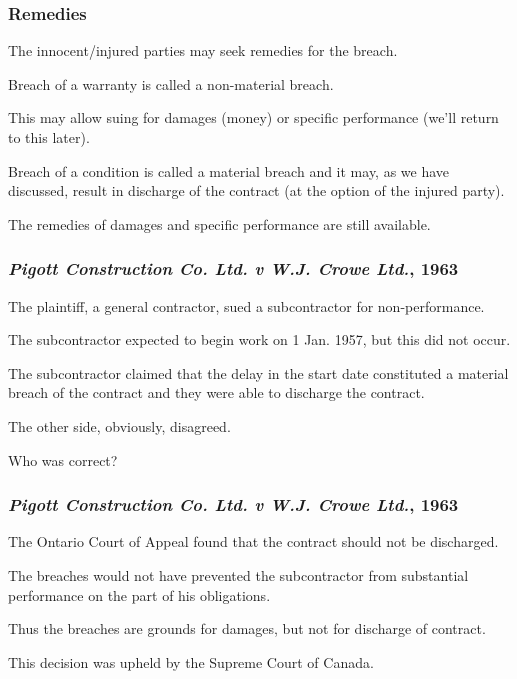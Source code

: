 \begin{frame}
\frametitle{Remedies}

The innocent/injured parties may seek \alert{remedies} for the breach. 

Breach of a warranty is called a \alert{non-material breach}. 

This may allow suing for damages (money) or specific performance (we'll return to this later).

Breach of a condition is called a \alert{material breach} and it may, as we have discussed, result in discharge of the contract (at the option of the injured party).

The remedies of damages and specific performance are still available.

\end{frame}



\begin{frame}
\frametitle{\textit{Pigott Construction Co. Ltd. v W.J. Crowe Ltd.}, 1963 }

The plaintiff, a general contractor, sued a subcontractor for non-performance.

The subcontractor expected to begin work on 1 Jan. 1957, but this did not occur.

The subcontractor claimed that the delay in the start date constituted a material breach of the contract and they were able to discharge the contract.

The other side, obviously, disagreed.

Who was correct?

\end{frame}



\begin{frame}
\frametitle{\textit{Pigott Construction Co. Ltd. v W.J. Crowe Ltd.}, 1963 }

The Ontario Court of Appeal found that the contract should not be discharged.

The breaches would not have prevented the subcontractor from substantial performance on the part of his obligations.

Thus the breaches are grounds for damages, but not for discharge of contract.

This decision was upheld by the Supreme Court of Canada.

\end{frame}



